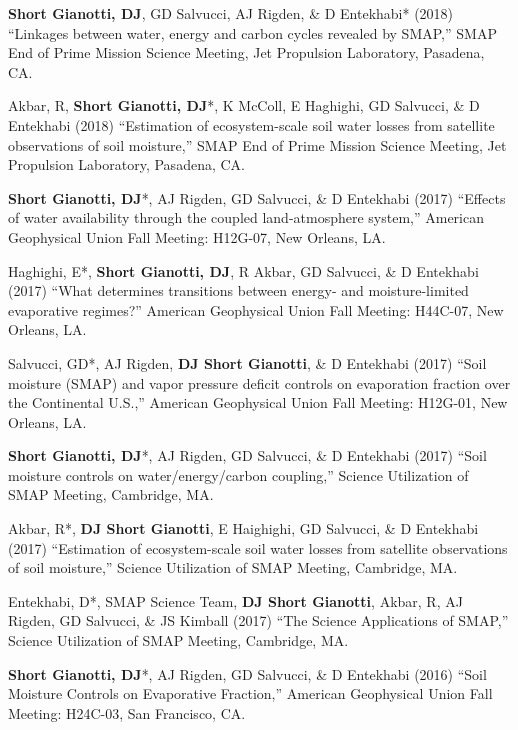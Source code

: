 \documentclass[10pt, a4paper]{article}
\newcommand{\lbr}{\vspace*{12pt}}
\newcommand{\years}[1]{\mbox{}\marginnote{\scriptsize #1}} %
\begin{document}
\years{2018}\textbf{Short Gianotti, DJ}, GD Salvucci, AJ Rigden, \& D Entekhabi* (2018) ``Linkages between water, energy and carbon cycles revealed by SMAP,'' SMAP End of Prime Mission Science Meeting, Jet Propulsion Laboratory, Pasadena, CA. \lbr %

\years{2018}Akbar, R, \textbf{Short Gianotti, DJ}*, K McColl, E Haghighi, GD Salvucci, \& D Entekhabi (2018) ``Estimation of ecosystem-scale soil water losses from satellite observations of soil moisture,'' SMAP End of Prime Mission Science Meeting, Jet Propulsion Laboratory, Pasadena, CA. \lbr %

\years{2017}\textbf{Short Gianotti, DJ}*, AJ Rigden, GD Salvucci, \& D Entekhabi (2017) ``Effects of water availability through the coupled land-atmosphere system,'' American Geophysical Union Fall Meeting: H12G-07, New Orleans, LA.\lbr

\years{2017}Haghighi, E*, \textbf{Short Gianotti, DJ}, R Akbar, GD Salvucci, \& D Entekhabi (2017) ``What determines transitions between energy- and moisture-limited evaporative regimes?'' American Geophysical Union Fall Meeting: H44C-07, New Orleans, LA.\lbr

\years{2017}Salvucci, GD*, AJ Rigden, \textbf{DJ Short Gianotti}, \& D Entekhabi (2017) ``Soil moisture (SMAP) and vapor pressure deficit controls on evaporation fraction over the Continental U.S.,'' American Geophysical Union Fall Meeting: H12G-01, New Orleans, LA.\lbr

\years{2017}\textbf{Short Gianotti, DJ}*, AJ Rigden, GD Salvucci, \& D Entekhabi (2017) ``Soil moisture controls on water/energy/carbon coupling,'' Science Utilization of SMAP Meeting, Cambridge, MA.\lbr

\years{2017}Akbar, R*, \textbf{DJ Short Gianotti}, E Haighighi, GD Salvucci, \& D Entekhabi (2017) ``Estimation of ecosystem-scale soil water losses from satellite observations of soil moisture,'' Science Utilization of SMAP Meeting, Cambridge, MA.\lbr %

\years{2017}Entekhabi, D*, SMAP Science Team, \textbf{DJ Short Gianotti}, Akbar, R, AJ Rigden, GD Salvucci, \& JS Kimball (2017) ``The Science Applications of SMAP,'' Science Utilization of SMAP Meeting, Cambridge, MA.\lbr %

\years{2016}\textbf{Short Gianotti, DJ}*, AJ Rigden, GD Salvucci, \& D Entekhabi (2016) ``Soil Moisture Controls on Evaporative Fraction,'' American Geophysical Union Fall Meeting: H24C-03, San Francisco, CA.\lbr
\end{document}

